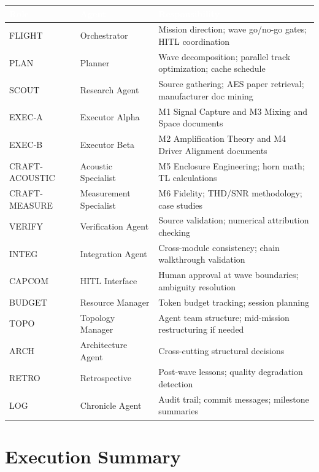 \documentclass[11pt,letterpaper]{article}
\newcommand{\tableheader}[1]{\textbf{\sffamily\textcolor{white}{#1}}}
\begin{document}
\begin{center}
\begin{tabularx}{\textwidth}{L{2cm}L{3.5cm}X}
\toprule
{}
\tableheader{Role} & \tableheader{Agent} & \tableheader{Responsibility} \\
\midrule
FLIGHT & Orchestrator & Mission direction; wave go/no-go gates; HITL coordination \\
PLAN & Planner & Wave decomposition; parallel track optimization; cache schedule \\
SCOUT & Research Agent & Source gathering; AES paper retrieval; manufacturer doc mining \\
EXEC-A & Executor Alpha & M1 Signal Capture and M3 Mixing and Space documents \\
EXEC-B & Executor Beta & M2 Amplification Theory and M4 Driver Alignment documents \\
CRAFT-ACOUSTIC & Acoustic Specialist & M5 Enclosure Engineering; horn math; TL calculations \\
CRAFT-MEASURE & Measurement Specialist & M6 Fidelity; THD/SNR methodology; case studies \\
VERIFY & Verification Agent & Source validation; numerical attribution checking \\
INTEG & Integration Agent & Cross-module consistency; chain walkthrough validation \\
CAPCOM & HITL Interface & Human approval at wave boundaries; ambiguity resolution \\
BUDGET & Resource Manager & Token budget tracking; session planning \\
TOPO & Topology Manager & Agent team structure; mid-mission restructuring if needed \\
ARCH & Architecture Agent & Cross-cutting structural decisions \\
RETRO & Retrospective & Post-wave lessons; quality degradation detection \\
LOG & Chronicle Agent & Audit trail; commit messages; milestone summaries \\
\bottomrule
\end{tabularx}
\end{center}

\section{Execution Summary}
\end{document}
